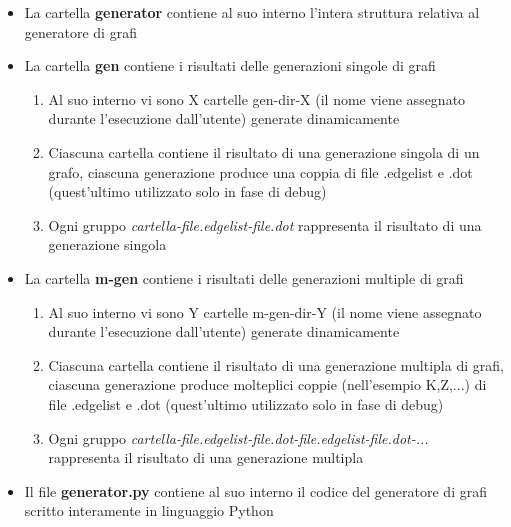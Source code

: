 \begin{itemize}
	\item La cartella \textbf{generator} contiene al suo interno l'intera struttura relativa al generatore di grafi
	\item La cartella \textbf{gen} contiene i risultati delle generazioni singole di grafi
	\begin{enumerate}
		\item Al suo interno vi sono X cartelle gen-dir-X (il nome viene assegnato durante l'esecuzione dall'utente) generate dinamicamente
		\item Ciascuna cartella contiene il risultato di una generazione singola di un grafo, ciascuna generazione produce una coppia di file .edgelist e .dot (quest'ultimo utilizzato solo in fase di debug)
		\item Ogni gruppo \textit{cartella-file.edgelist-file.dot} rappresenta il risultato di una generazione singola
	\end{enumerate}
	\item La cartella \textbf{m-gen} contiene i risultati delle generazioni multiple di grafi
	\begin{enumerate}
		\item Al suo interno vi sono Y cartelle m-gen-dir-Y (il nome viene assegnato durante l'esecuzione dall'utente) generate dinamicamente
		\item Ciascuna cartella contiene il risultato di una generazione multipla di grafi, ciascuna generazione produce molteplici coppie (nell'esempio K,Z,...) di file .edgelist e .dot (quest'ultimo utilizzato solo in fase di debug)
		\item Ogni gruppo \textit{cartella-file.edgelist-file.dot-file.edgelist-file.dot-...}\\
		rappresenta il risultato di una generazione multipla
	\end{enumerate}
	\item Il file \textbf{generator.py} contiene al suo interno il codice del generatore di grafi scritto interamente in linguaggio Python
\end{itemize}

